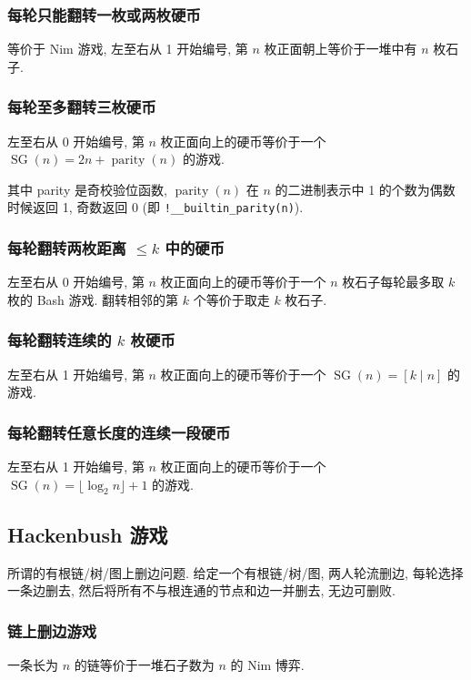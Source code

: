 \subsubsection{每轮只能翻转一枚或两枚硬币}
等价于 Nim 游戏, 左至右从 1 开始编号, 第 $n$ 枚正面朝上等价于一堆中有 $n$ 枚石子.

\subsubsection{每轮至多翻转三枚硬币}
左至右从 0 开始编号, 第 $n$ 枚正面向上的硬币等价于一个 $\operatorname{SG}(n)=2n+\operatorname{parity}(n)$ 的游戏.

其中 parity 是奇校验位函数, $\operatorname{parity}(n)$ 在 $n$ 的二进制表示中 1 的个数为偶数时候返回 1, 奇数返回 0 (即 \lstinline{!__builtin_parity(n)}).

\subsubsection{每轮翻转两枚距离 \(\le k\) 中的硬币}
左至右从 0 开始编号, 第 $n$ 枚正面向上的硬币等价于一个 $n$ 枚石子每轮最多取 $k$ 枚的 Bash 游戏. 翻转相邻的第 $k$ 个等价于取走 $k$ 枚石子.

\subsubsection{每轮翻转连续的 \(k\) 枚硬币}
左至右从 1 开始编号, 第 $n$ 枚正面向上的硬币等价于一个 $\operatorname{SG}(n)=[k\mid n]$ 的游戏.

\subsubsection{每轮翻转任意长度的连续一段硬币}
左至右从 1 开始编号, 第 $n$ 枚正面向上的硬币等价于一个 $\operatorname{SG}(n)=\lfloor\log_2n\rfloor+1$ 的游戏.

\clearpage
\subsection{Hackenbush 游戏}
所谓的有根链/树/图上删边问题. 给定一个有根链/树/图, 两人轮流删边, 每轮选择一条边删去, 然后将所有不与根连通的节点和边一并删去, 无边可删败.

\subsubsection{链上删边游戏}
一条长为 $n$ 的链等价于一堆石子数为 $n$ 的 Nim 博弈.

